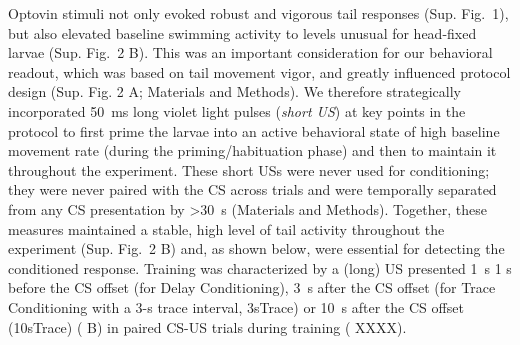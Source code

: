 Optovin stimuli not only evoked robust and vigorous tail responses (Sup. Fig.~1), but also elevated baseline swimming activity to levels unusual for head-fixed larvae (Sup. Fig.~2 B).
This was an important consideration for our behavioral readout, which was based on tail movement vigor, and greatly influenced protocol design (Sup. Fig. 2 A; Materials and Methods). We therefore strategically incorporated \SI{50}{\milli\second} long violet light pulses (\textit{short US}) at key points in the protocol to first prime the larvae into an active behavioral state of high baseline movement rate (during the priming/habituation phase) and then to maintain it throughout the experiment. These short USs were never used for conditioning; they were never paired with the CS across trials and were temporally separated from any CS presentation by >30~s (Materials and Methods).
Together, these measures maintained a stable, high level of tail activity throughout the experiment (Sup. Fig.~2 B) and, as shown below, were essential for detecting the conditioned response.
Training was characterized by a (long) US presented \SI{1}{\second} 1 s before the CS offset (for Delay Conditioning), \SI{3}{\second} after the CS offset (for Trace Conditioning with a 3-s trace interval, 3sTrace) or \SI{10}{\second} after the CS offset (10sTrace) ( B) in paired CS-US trials during training ( XXXX).

